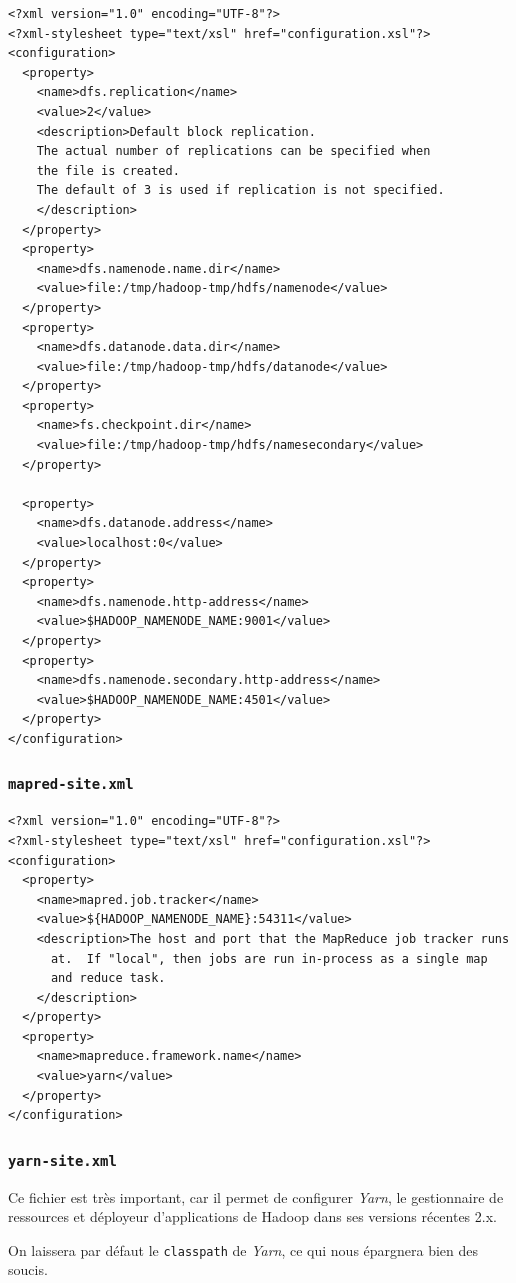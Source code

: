 \begin{verbatim}
<?xml version="1.0" encoding="UTF-8"?>
<?xml-stylesheet type="text/xsl" href="configuration.xsl"?>
<configuration>
  <property>
    <name>dfs.replication</name>
    <value>2</value>
    <description>Default block replication.
    The actual number of replications can be specified when 
    the file is created.
    The default of 3 is used if replication is not specified.
    </description>
  </property>
  <property>
    <name>dfs.namenode.name.dir</name>
    <value>file:/tmp/hadoop-tmp/hdfs/namenode</value>
  </property>
  <property>
    <name>dfs.datanode.data.dir</name>
    <value>file:/tmp/hadoop-tmp/hdfs/datanode</value>
  </property>
  <property>
    <name>fs.checkpoint.dir</name>
    <value>file:/tmp/hadoop-tmp/hdfs/namesecondary</value>
  </property>

  <property>
    <name>dfs.datanode.address</name>
    <value>localhost:0</value>
  </property>
  <property>
    <name>dfs.namenode.http-address</name>
    <value>$HADOOP_NAMENODE_NAME:9001</value>
  </property>
  <property>
    <name>dfs.namenode.secondary.http-address</name>
    <value>$HADOOP_NAMENODE_NAME:4501</value>
  </property>
</configuration>
\end{verbatim}

\subsubsection{\texttt{mapred-site.xml}}
\label{sec:mapred-site.xml-1}

\begin{verbatim}
<?xml version="1.0" encoding="UTF-8"?>
<?xml-stylesheet type="text/xsl" href="configuration.xsl"?>
<configuration>
  <property>
    <name>mapred.job.tracker</name>
    <value>${HADOOP_NAMENODE_NAME}:54311</value>
    <description>The host and port that the MapReduce job tracker runs
      at.  If "local", then jobs are run in-process as a single map
      and reduce task.
    </description>
  </property>
  <property>
    <name>mapreduce.framework.name</name>
    <value>yarn</value>
  </property>
</configuration>
\end{verbatim}

\subsubsection{\texttt{yarn-site.xml}}
\label{sec:yarn-site.xml}

\par Ce fichier est très important, car il permet de configurer \emph{Yarn}, le gestionnaire de ressources et déployeur d'applications de Hadoop dans ses versions récentes 2.x.
\par On laissera par défaut le \texttt{classpath} de \emph{Yarn}, ce qui nous épargnera bien des soucis. 


